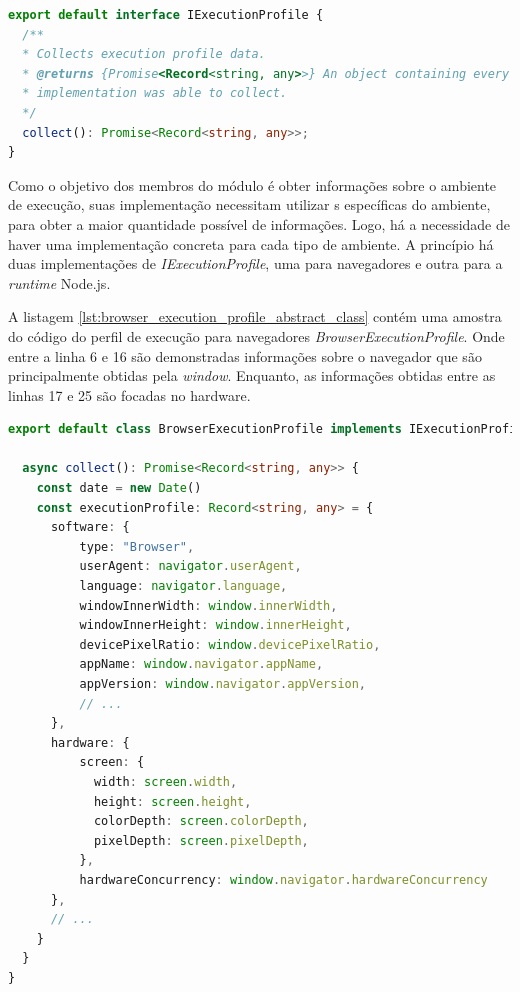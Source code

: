 \documentclass[12pt]{tcc}
\begin{document}
\begin{lstlisting}[label={lst:execution_profile_abstract_class}, caption={Implementação da classe responsável por representar um perfil de execução.}, language=TypeScript, breaklines=true]
export default interface IExecutionProfile {
  /**
  * Collects execution profile data.
  * @returns {Promise<Record<string, any>>} An object containing every execution profile data the
  * implementation was able to collect.
  */
  collect(): Promise<Record<string, any>>;
}
\end{lstlisting}

	Como o objetivo dos membros do módulo é obter informações sobre o ambiente de execução, suas implementação necessitam utilizar s específicas do ambiente, para obter a maior quantidade possível de informações.
	Logo, há a necessidade de haver uma implementação concreta para cada tipo de ambiente.
	A princípio há duas implementações de \emph{IExecutionProfile}, uma para navegadores e outra para a \emph{runtime} Node.js.

	A listagem \ref{lst:browser_execution_profile_abstract_class} contém uma amostra do código do perfil de execução para navegadores \emph{BrowserExecutionProfile}.
	Onde entre a linha 6 e 16 são demonstradas informações sobre o navegador que são principalmente obtidas pela  \emph{window}.
	Enquanto, as informações obtidas entre as linhas 17 e 25 são focadas no hardware.

\begin{minipage}{\linewidth}
\begin{lstlisting}[label={lst:browser_execution_profile_abstract_class}, caption={Fragmento de código da classe \emph{BrowserExecutionProfile} responsável por gerar um perfis de execução em navegadores.}, language=TypeScript, breaklines=true]
export default class BrowserExecutionProfile implements IExecutionProfile {

  async collect(): Promise<Record<string, any>> {
    const date = new Date()
    const executionProfile: Record<string, any> = {
      software: {
          type: "Browser",
          userAgent: navigator.userAgent,
          language: navigator.language,
          windowInnerWidth: window.innerWidth,
          windowInnerHeight: window.innerHeight,
          devicePixelRatio: window.devicePixelRatio,
          appName: window.navigator.appName,
          appVersion: window.navigator.appVersion,
          // ...
      },
      hardware: {
          screen: {
            width: screen.width,
            height: screen.height,
            colorDepth: screen.colorDepth,
            pixelDepth: screen.pixelDepth,
          },
          hardwareConcurrency: window.navigator.hardwareConcurrency
      },
      // ...
    }
  }
}
\end{lstlisting}
\end{minipage}
\end{document}
